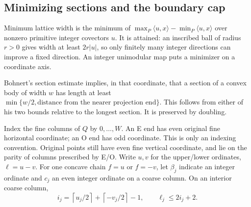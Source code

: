 \documentclass[11pt]{article}
\begin{document}
\subsection{Minimizing sections and the boundary cap}
Minimum lattice width is the minimum of
\(\max_P\langle u,x\rangle-\min_P\langle u,x\rangle\) over nonzero
primitive integer covectors \(u\). It is attained: an inscribed ball of
radius \(r>0\) gives width at least \(2r|u|\), so only finitely many
integer directions can improve a fixed direction.
An integer unimodular map puts a minimizer on a coordinate axis.

Bohnert's section estimate \cite[Lemma 2.12]{AreaBounds} implies, in that
coordinate, that a section of a convex body of width \(w\) has length at least
\(\min\{w/2,\text{distance from the nearer projection end}\}\).
This follows from either of his two bounds relative to the longest section.
It is preserved by doubling.

Index the fine columns of \(Q\) by \(0,\ldots,W\). An E end has even
original fine horizontal coordinate; an O end has odd coordinate.
This is only an indexing convention. Original points still have even fine
vertical coordinate, and lie on the parity of columns prescribed by E/O.
Write \(u,v\) for the upper/lower ordinates, \(\ell=u-v\).
For one concave chain \(f=u\) or \(f=-v\), let \(\beta_j\) indicate an
integer ordinate and \(c_j\) an even integer ordinate on a coarse column.
On an interior coarse column,
\[
 i_j=\left\lceil u_j/2\right\rceil+
       \left\lceil-v_j/2\right\rceil-1,\qquad \ell_j\le2i_j+2.
\]
\end{document}
